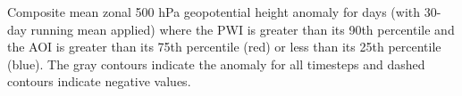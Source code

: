\label{fig:sam_composite}
Composite mean zonal 500 hPa geopotential height anomaly for days (with 30-day running mean applied) where the PWI is greater than its 90th percentile and the AOI is greater than its 75th percentile (red) or less than its 25th percentile (blue). The gray contours indicate the anomaly for all timesteps and dashed contours indicate negative values. 